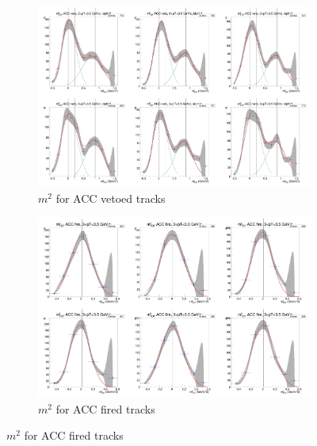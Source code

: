 \begin{figure}[H]
  \ContinuedFloat
    \begin{subfigure}{1\textwidth}
    \includegraphics[width=1\textwidth]{hiptfits/neg/PSm2_cent0_ich0_accfire0_ptbin12.jpg}
    \caption{$m^2$ for ACC vetoed tracks}
    \end{subfigure}
    \begin{subfigure}{1\textwidth}
    \includegraphics[width=1\textwidth]{hiptfits/neg/PSm2_cent0_ich0_accfire1_ptbin12.jpg}
    \caption{$m^2$ for ACC fired tracks}
    \end{subfigure}  
\end{figure}
